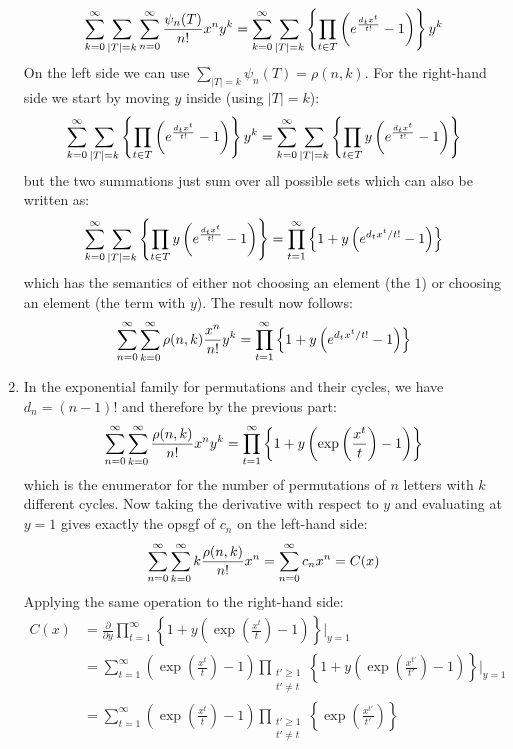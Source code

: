 \begin{solution}
\begin{enumerate}[label=(\alph*)]
        \[
            \bsum[k] \sum_{|T| = k} \bsum[n] \frac{\psi_n(T)}{n!}x^ny^k =\bsum[k] \sum_{|T|=k} \left\{\prod_{t\in T}\left(e^{\frac{d_tx^t}{t!}} - 1 \right)\right\}y^k
        \]
        On the left side we can use $\sum_{|T| = k} \psi_n(T) = \rho(n,k)$. For the right-hand side we start by moving $y$ inside (using $|T|=k$):
        \[
            \bsum[k] \sum_{|T|=k} \left\{\prod_{t\in T}\left(e^{\frac{d_tx^t}{t!}} - 1 \right)\right\}y^k = \bsum[k] \sum_{|T|=k} \left\{\prod_{t\in T}y\left(e^{\frac{d_tx^t}{t!}} - 1 \right)\right\}
        \]
        but the two summations just sum over all possible sets which can also be written as:
        \[
            \bsum[k] \sum_{|T|=k} \left\{\prod_{t\in T}y\left(e^{\frac{d_tx^t}{t!}} - 1 \right)\right\} = \prod_{t=1}^\infty \left\{ 1+y\left(e^{d_tx^t/t!} - 1\right)\right\}
        \]
        which has the semantics of either not choosing an element (the $1$) or choosing an element (the term with $y$). The result now follows:
        \[
            \bsum[n]\bsum[k] \rho(n,k) \frac{x^n}{n!} y^k = \prod_{t=1}^\infty\left\{1+y\left(e^{d_tx^t/t!}-1\right)\right\}
        \]
        \item In the exponential family for permutations and their cycles, we have $d_n = (n-1)!$ and therefore by the previous part:
        \[
            \bsum[n]\bsum[k] \frac{\rho(n,k)}{n!} x^n y^k = \prod_{t=1}^\infty\left\{1+y\left(\exp\left(\frac{x^t}{t}\right)-1\right)\right\}
        \]
        which is the enumerator for the number of permutations of $n$ letters with $k$ different cycles. Now taking the derivative with respect to $y$ and evaluating at $y=1$ gives exactly the opsgf of $c_n$ on the left-hand side:
        \[
            \bsum[n]\bsum[k] k\frac{\rho(n,k)}{n!} x^n = \bsum[n] c_n x^n = C(x)
        \]
        Applying the same operation to the right-hand side:
        \begin{align*}
            C(x) &= \frac{\partial}{\partial y} \prod_{t=1}^\infty\left\{1+y\left(\exp\left(\frac{x^t}{t}\right)-1\right)\right\}\bigg\rvert_{y=1} \\
            &= \sum_{t=1}^\infty \left(\exp\left(\frac{x^t}{t}\right)-1\right) \prod_{\substack{t'\geq 1\\ t'\neq t}}\left\{1+y\left(\exp\left(\frac{x^{t'}}{t'}\right)-1\right)\right\}\bigg\rvert_{y=1} 
            \\
            &= \sum_{t=1}^\infty \left(\exp\left(\frac{x^t}{t}\right)-1\right) \prod_{\substack{t'\geq 1\\ t'\neq t}}\left\{\exp\left(\frac{x^{t'}}{t'}\right)\right\}

\end{align*}
\end{enumerate}
\end{solution}
